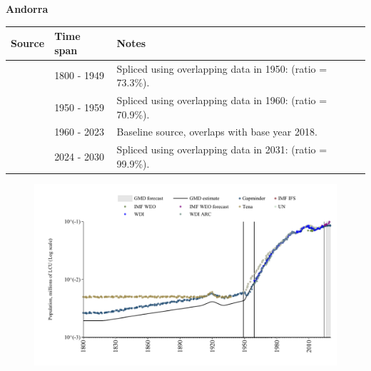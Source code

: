 \documentclass[12pt,a4paper,landscape]{article}
\begin{document}
\begin{adjustbox}{max totalsize={\paperwidth}{\paperheight},center}
\begin{minipage}[t][\textheight][t]{\textwidth}
\vspace*{0.5cm}
{}
\begin{center}
{\Large\bfseries Andorra}
\end{center}
\vspace{0.5cm}
\begin{table}[H]
\centering
\small
\begin{tabular}{|l|l|l|}
\hline
\textbf{Source} & \textbf{Time span} & \textbf{Notes} \\
\hline
\rowcolor{white}\cite{Gapminder}& 1800 - 1949 &Spliced using overlapping data in 1950: (ratio = 73.3\%).\\
\rowcolor{lightgray}\cite{IMF_IFS}& 1950 - 1959 &Spliced using overlapping data in 1960: (ratio = 70.9\%).\\
\rowcolor{white}\cite{WDI}& 1960 - 2023 &Baseline source, overlaps with base year 2018.\\
\rowcolor{lightgray}\cite{Gapminder}& 2024 - 2030 &Spliced using overlapping data in 2031: (ratio = 99.9\%).\\
\hline
\end{tabular}
\end{table}
\begin{figure}[H]
\centering
\includegraphics[width=\textwidth,height=0.6\textheight,keepaspectratio]{graphs/AND_pop.pdf}
\end{figure}
\end{minipage}
\end{adjustbox}
\end{document}
